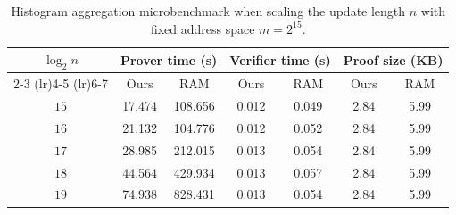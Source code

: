 \begin{table}[t]
    \centering
    \small
    \caption{Histogram aggregation microbenchmark when scaling the update
    length $n$ with fixed address space $m=2^{15}$.}
    \label{tab:histogram-n-scale}
    \begin{tabular}{ccccccc}
        \toprule
        \multirow{2}{*}{$\log_2 n$}
        & \multicolumn{2}{c}{Prover time (s)}
        & \multicolumn{2}{c}{Verifier time (s)}
        & \multicolumn{2}{c}{Proof size (KB)} \\
        \cmidrule(lr){2-3} \cmidrule(lr){4-5} \cmidrule(lr){6-7}
        & Ours & RAM & Ours & RAM & Ours & RAM \\
        \midrule
        $15$ & 17.474 & 108.656 & 0.012 & 0.049 & 2.84 & 5.99 \\
        $16$ & 21.132 & 104.776 & 0.012 & 0.052 & 2.84 & 5.99 \\
        $17$ & 28.985 & 212.015 & 0.013 & 0.054 & 2.84 & 5.99 \\
        $18$ & 44.564 & 429.934 & 0.013 & 0.057 & 2.84 & 5.99 \\
        $19$ & 74.938 & 828.431 & 0.013 & 0.054 & 2.84 & 5.99 \\
        \bottomrule
    \end{tabular}
\end{table}
